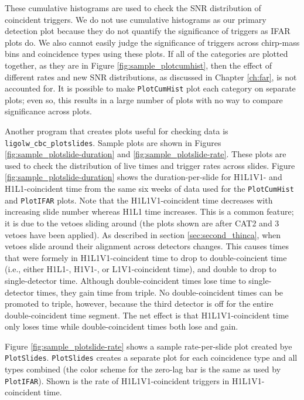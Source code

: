 These cumulative histograms are used to check the \ac{SNR} distribution of
coincident triggers. We do not use cumulative histograms as our primary
detection plot because they do not quantify the significance of triggers as
IFAR plots do. We also cannot easily judge the significance of triggers across
chirp-mass bins and coincidence types using these plots. If all of the
categories are plotted together, as they are in Figure
\ref{fig:sample_plotcumhist}, then the effect of different rates and new
\ac{SNR} distributions, as discussed in Chapter \ref{ch:far}, is not accounted
for. It is possible to make \texttt{PlotCumHist} plot each category on separate
plots; even so, this results in a large number of plots with no way to compare
significance across plots.

Another program that creates plots useful for checking data is
\verb|ligolw_cbc_plotslides|. Sample plots are shown in Figures
\ref{fig:sample_plotslide-duration} and \ref{fig:sample_plotslide-rate}. These
plots are used to check the distribution of live times and trigger rates across
slides. Figure \ref{fig:sample_plotslide-duration} shows the duration-per-slide
for H1L1V1- and H1L1-coincident time from the same six weeks of data used for
the \texttt{PlotCumHist} and \texttt{PlotIFAR} plots. Note that the
H1L1V1-coincident time decreases with increasing slide number whereas H1L1 time
increases. This is a common feature; it is due to the vetoes sliding around
(the plots shown are after CAT2 and 3 vetoes have been applied). As described
in section \ref{sec:second_thinca}, when vetoes slide around their alignment
across detectors changes. This causes times that were formely in
H1L1V1-coincident time to drop to double-coincient time (i.e., either H1L1-,
H1V1-, or L1V1-coincident time), and double to drop to single-detector time.
Although double-coincident times lose time to single-detector times, they gain
time from triple. No double-coincident times can be promoted to triple,
however, because the third detector is off for the entire double-coincident
time segment. The net effect is that H1L1V1-coincident time only loses time
while double-coincident times both lose and gain.

Figure \ref{fig:sample_plotslide-rate} shows a sample rate-per-slide plot
created bye \texttt{PlotSlides}. \texttt{PlotSlides} creates a separate plot
for each coincidence type and all types combined (the color scheme for the
zero-lag bar is the same as used by \texttt{PlotIFAR}). Shown is the rate of
H1L1V1-coincident triggers in H1L1V1-coincident time.

